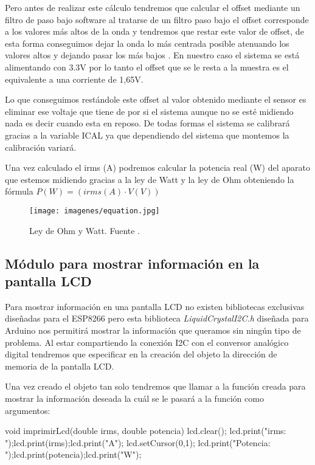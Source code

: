 \begin{itemize}
Pero antes de realizar este cálculo tendremos que calcular el offset mediante un filtro de paso bajo software al tratarse de un filtro paso bajo el offset corresponde a los valores más altos de la onda y tendremos que restar este valor de offset, de esta forma conseguimos dejar la onda lo más centrada posible atenuando los valores altos y dejando pasar los más bajos \cite{pasobajowikipedia} . En nuestro caso el sistema se está alimentando con 3.3V por lo tanto el offset que se le resta a la muestra es el equivalente a una corriente de 1,65V.

Lo que conseguimos restándole este offset al valor obtenido mediante el sensor es eliminar ese voltaje que tiene de por si el sistema aunque no se esté midiendo nada es decir cuando esta en reposo. De todas formas el sistema se calibrará gracias a la variable ICAL ya que dependiendo del sistema que montemos la calibración variará.

Una vez calculado el irms (A) podremos calcular la potencia real (W) del aparato que estemos midiendo gracias a la ley de Watt y la ley de Ohm obteniendo la fórmula $ P(W) = (irms(A) \cdot V(V))$ 


\begin{figure}[H]
	\centering
	\texttt{[image: imagenes/equation.jpg]}
	\caption[Ley de Ohm y Watt.]{Ley de Ohm y Watt. Fuente \cite{calculadoraohm}.}
	\label{fig:formulaondas}
\end{figure}


\end{itemize}

\subsection{Módulo para mostrar información en la pantalla LCD}

Para mostrar información en una pantalla LCD no existen bibliotecas exclusivas diseñadas para el ESP8266 pero esta biblioteca \textit{LiquidCrystal\textunderscore I2C.h} diseñada para Arduino \cite{lcdgithub} nos permitirá mostrar la información que queramos sin ningún tipo de problema. Al estar compartiendo la conexión I2C con el conversor analógico digital tendremos que especificar en la creación del objeto la dirección de memoria de la pantalla LCD. 

Una vez creado el objeto tan solo tendremos que llamar a la función creada para mostrar la información deseada la cuál se le pasará a la función como argumentos:

\begin{listing}[style=consola, numbers=none]
	void imprimirLcd(double irms, double potencia){
		lcd.clear();
		lcd.print("irms: ");lcd.print(irms);lcd.print("A");
		lcd.setCursor(0,1);
		lcd.print("Potencia: ");lcd.print(potencia);lcd.print("W");
	}
\end{listing} 




